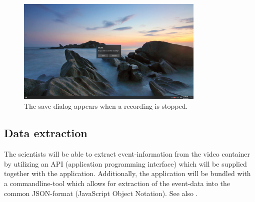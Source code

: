 \begin{figure}[H]
  \includegraphics[width=0.8\textwidth, trim={20cm 10cm 20cm 10cm}, clip]{resources/ui_save_dialogue.png}
  \centering
  \caption{The save dialog appears when a recording is stopped.}
  \label{fig:sm_ui_saving}
\end{figure}

\subsection{Data extraction}
\label{sec:sm_extraction}
The \glspl{scientist} will be able to extract \gls{event}-information from the video container by utilizing an API (application programming interface) which will be supplied together with the application. Additionally, the application will be bundled with a commandline-tool which allows for extraction of the \gls{event}-data into the common JSON-format (JavaScript Object Notation). See also .